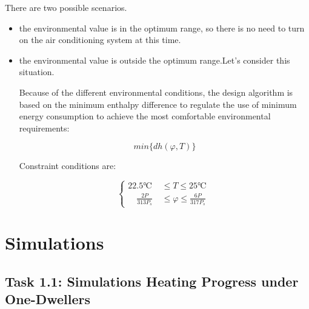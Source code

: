 \documentclass{mcmthesis}
\begin{document}
			There are two possible scenarios.
			\begin{itemize}
				\item the environmental value is in the optimum range, so there is no need to turn on the air conditioning system at this time.
				
				\item the environmental value is outside the optimum range.Let's consider this situation.
				
				Because of the different environmental conditions, the design algorithm is based on the minimum enthalpy difference to regulate the use of minimum energy consumption to achieve the most comfortable environmental requirements:
				
				\begin{equation}
					min\{dh(\varphi,T)\}
				\end{equation}
				
				Constraint conditions are:
				
				$$
				\begin{cases}
				22.5 \text{℃ } &\leq T \leq 25 \text{℃ }  \\ 
				\quad \frac{2P}{313P_s} &\leq \varphi \leq \frac{6P}{317P_s}
				\end{cases}
				$$
				
			\end{itemize}
		
	
	
	
	\section{Simulations}
		\subsection{Task 1.1: Simulations Heating Progress under One-Dwellers}
\end{document}
